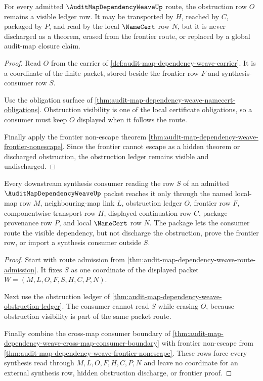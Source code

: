 \begin{theorem}
\label{thm:audit-map-dependency-weave-obstruction-ledger}
For every admitted $\AuditMapDependencyWeaveUp$ route, the obstruction row $O$ remains a visible ledger row. It may be transported by $H$, reached by $C$, packaged by $P$, and read by the local $\NameCert$ row $N$, but it is never discharged as a theorem, erased from the frontier route, or replaced by a global audit-map closure claim.
\end{theorem}
\begin{proof}
Read $O$ from the carrier of \autoref{def:audit-map-dependency-weave-carrier}. It is a coordinate of the finite packet, stored beside the frontier row $F$ and synthesis-consumer row $S$.

Use the obligation surface of \autoref{thm:audit-map-dependency-weave-namecert-obligations}. Obstruction visibility is one of the local certificate obligations, so a consumer must keep $O$ displayed when it follows the route.

Finally apply the frontier non-escape theorem \autoref{thm:audit-map-dependency-weave-frontier-nonescape}. Since the frontier cannot escape as a hidden theorem or discharged obstruction, the obstruction ledger remains visible and undischarged.
\end{proof}

\begin{theorem}
\label{thm:audit-map-dependency-weave-synthesis-namecert-package}
Every downstream synthesis consumer reading the row $S$ of an admitted $\AuditMapDependencyWeaveUp$ packet reaches it only through the named local-map row $M$, neighbouring-map link $L$, obstruction ledger $O$, frontier row $F$, componentwise transport row $H$, displayed continuation row $C$, package provenance row $P$, and local $\NameCert$ row $N$. The package lets the consumer route the visible dependency, but not discharge the obstruction, prove the frontier row, or import a synthesis consumer outside $S$.
\end{theorem}
\begin{proof}
Start with route admission from \autoref{thm:audit-map-dependency-weave-route-admission}. It fixes $S$ as one coordinate of the displayed packet $W=(M,L,O,F,S,H,C,P,N)$.

Next use the obstruction ledger of \autoref{thm:audit-map-dependency-weave-obstruction-ledger}. The consumer cannot read $S$ while erasing $O$, because obstruction visibility is part of the same packet route.

Finally combine the cross-map consumer boundary of \autoref{thm:audit-map-dependency-weave-cross-map-consumer-boundary} with frontier non-escape from \autoref{thm:audit-map-dependency-weave-frontier-nonescape}. These rows force every synthesis read through $M,L,O,F,H,C,P,N$ and leave no coordinate for an external synthesis row, hidden obstruction discharge, or frontier proof.
\end{proof}

